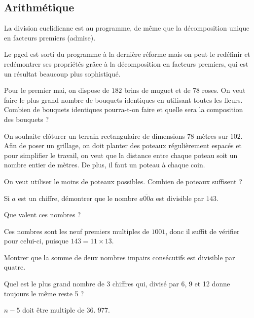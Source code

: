 \subsection{Arithmétique}
La division euclidienne est au programme, de même que la décomposition unique en facteurs premiers (admise).

Le pgcd est sorti du programme à la dernière réforme mais on peut le  redéfinir et  redémontrer ses propriétés grâce à la décomposition en facteurs premiers, qui est un résultat beaucoup plus sophistiqué.


\begin{exo}[Muguet]
Pour le premier mai, on dispose de $182$ brins de muguet et de $78$ roses.
On veut faire le plus grand nombre de bouquets identiques en utilisant toutes les fleurs. Combien de bouquets identiques pourra-t-on faire et quelle sera la composition des bouquets ?
\end{exo}

\begin{exo}
On souhaite clôturer un terrain rectangulaire de dimensions $78$ mètres sur $102$. Afin de poser un grillage, on doit planter des poteaux régulièrement espacés et pour simplifier le travail, on veut que la distance entre chaque poteau soit un nombre entier de mètres. De plus, il faut un poteau à chaque coin.

On veut utiliser le moins de poteaux possibles. Combien de poteaux suffisent ?
\end{exo}

\begin{exo}
Si $a$ est un chiffre, démontrer que le nombre $\overline{a00a}$ est divisible par $143$.
\begin{hint}
Que valent ces nombres ?
\end{hint}
\begin{sol}
Ces nombres sont les neuf premiers multiples de $1001$, donc il suffit de vérifier pour celui-ci, puisque $143=11\times 13$.
\end{sol}
\end{exo}

\begin{exo}
Montrer que la somme de deux nombres impairs consécutifs est divisible par quatre.
\end{exo}

\begin{exo}
Quel est le plus grand nombre de 3 chiffres qui, divisé par 6, 9 et 12 donne toujours le même reste 5 ? 
\begin{sol}
$n-5$ doit être multiple de $36$.
$977$.
\end{sol}
\end{exo}


